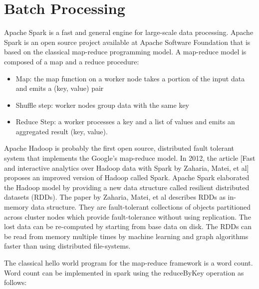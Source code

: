 \documentclass{lmproj}
\begin{document}
\section{Batch Processing}
\label{relatedwork}

Apache Spark is a fast and general engine for large-scale data processing.  Apache Spark is an open source project available at Apache Software Foundation that is based on the classical map-reduce programming model. A map-reduce model is composed of a map and a reduce procedure:

\begin{itemize}
	\item Map: the map function on a worker node takes a portion of the input data and emits a (key, value) pair
	\item Shuffle step: worker nodes group data with the same key
	\item Reduce Step: a worker processes a key and a list of values and emits an aggregated result (key, value).
\end{itemize}

Apache Hadoop is probably the first open source, distributed fault tolerant system that implements the Google’s map-reduce model. In 2012, the article [Fast and interactive analytics over Hadoop data with Spark by Zaharia, Matei, et al] proposes an improved version of Hadoop called Spark. Apache Spark elaborated the Hadoop model by providing a new data structure called resilient distributed datasets (RDDs). The paper by Zaharia, Matei, et al describes RDDs as in-memory data structure. They are fault-tolerant collections of objects partitioned across cluster nodes which provide fault-tolerance without using replication. The lost data can be re-computed by starting from base data on disk. The RDDs can be read from memory multiple times by machine learning and graph algorithms faster than using distributed file-systems.  

The classical hello world program for the map-reduce framework is a word count. Word count can be implemented in spark using the reduceByKey operation as follows:
\end{document}
